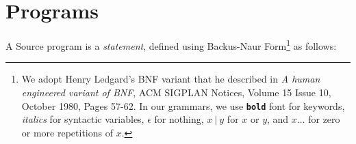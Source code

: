 \section*{Programs}

A Source program is a \emph{statement}, defined using Backus-Naur Form\footnote{
We adopt Henry Ledgard's BNF variant that he described in
\emph{A human engineered variant of BNF}, ACM SIGPLAN Notices, Volume 15 Issue 10,
October 1980, Pages 57-62. In our grammars, we use \textbf{\texttt{bold}} font for keywords,
{\it italics} for syntactic variables, $\epsilon$ for nothing,
$x\ |\ y$ for $x$ or $y$, and $ x \ldots$ for zero or more repetitions of $x$.}
as follows:
